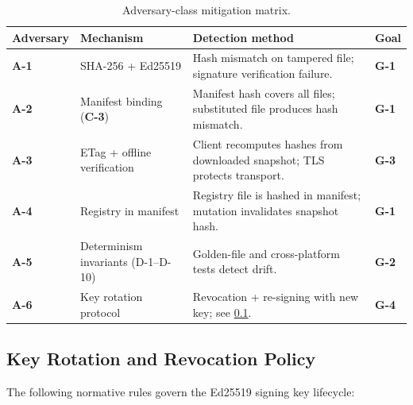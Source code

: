 \begin{table}[htbp]
  \centering\small
  \caption{Adversary-class mitigation matrix.}\label{tab:threat-mitigation}
  \begin{tabularx}{\textwidth}{@{}l l X l@{}}
    \toprule
    \textbf{Adversary} & \textbf{Mechanism} & \textbf{Detection method} &
      \textbf{Goal} \\
    \midrule
    \textbf{A-1} & SHA-256 + Ed25519 & Hash mismatch on tampered file;
      signature verification failure. & \textbf{G-1} \\
    \textbf{A-2} & Manifest binding (\textbf{C-3}) & Manifest hash covers
      all files; substituted file produces hash mismatch. & \textbf{G-1} \\
    \textbf{A-3} & ETag + offline verification & Client recomputes hashes
      from downloaded snapshot; TLS protects transport. & \textbf{G-3} \\
    \textbf{A-4} & Registry in manifest & Registry file is hashed in
      manifest; mutation invalidates snapshot hash. & \textbf{G-1} \\
    \textbf{A-5} & Determinism invariants (D-1--D-10) & Golden-file and
      cross-platform tests detect drift. & \textbf{G-2} \\
    \textbf{A-6} & Key rotation protocol & Revocation + re-signing with
      new key; see \cref{sec:threat:key-rotation}. & \textbf{G-4} \\
    \bottomrule
  \end{tabularx}
\end{table}

\subsection{Key Rotation and Revocation Policy}\label{sec:threat:key-rotation}

The following normative rules govern the Ed25519 signing key lifecycle:

